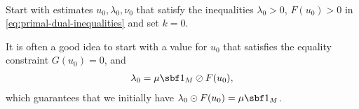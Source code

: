 \documentclass[11pt]{article}
\begin{document}
\begin{algorithm}~\label{al:primal-dual-o}
\begin{steps}
\item Start with estimates $u_0,\lambda_0,\nu_0$ that satisfy the inequalities
  $\lambda_0>0$, $F(u_0)> 0$ in \eqref{eq:primal-dual-inequalities}
  and set $k=0$.

  It is often a good idea to start with a value for $u_0$ that
  satisfies the equality constraint $G(u_0)=0$, and
  \begin{align*}
    \lambda_0=\mu\sbf 1_{M}\oslash F(u_0),
  \end{align*}
  which guarantees that we initially have
  $\lambda_0\odot F(u_0)=\mu\sbf 1_{M}$.


\end{steps}
\end{algorithm}
\end{document}
